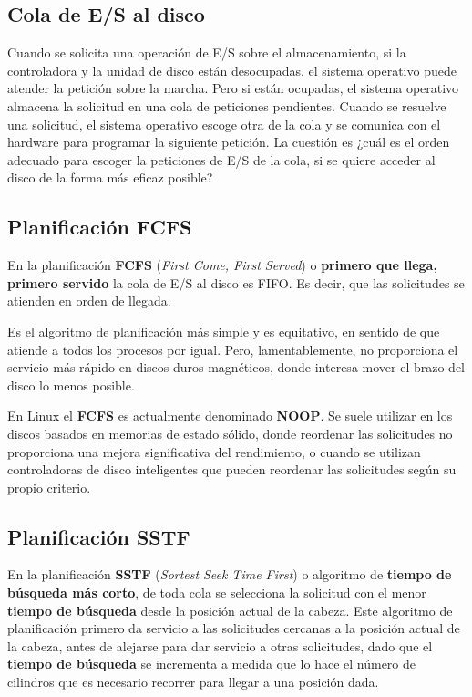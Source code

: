 \subsection{Cola de E/S al disco}\label{_cola_de_es_al_disco}

{} Cuando se solicita una operación de E/S sobre el almacenamiento, si
la controladora y la unidad de disco están desocupadas, el sistema
operativo puede atender la petición sobre la marcha. Pero si están
ocupadas, el sistema operativo almacena la solicitud en una cola de
peticiones pendientes. Cuando se resuelve una solicitud, el sistema
operativo escoge otra de la cola y se comunica con el hardware para
programar la siguiente petición. La cuestión es ¿cuál es el orden
adecuado para escoger la peticiones de E/S de la cola, si se quiere
acceder al disco de la forma más eficaz posible?

\subsection{Planificación FCFS}\label{_planificaciuxf3n_fcfs}

{} En la planificación \textbf{{}FCFS} (\emph{First Come, First Served})
o \textbf{primero que llega, primero servido} la cola de E/S al disco es
FIFO. Es decir, que las solicitudes se atienden en orden de llegada.

Es el algoritmo de planificación más simple y es equitativo, en sentido
de que atiende a todos los procesos por igual. Pero, lamentablemente, no
proporciona el servicio más rápido en discos duros magnéticos, donde
interesa mover el brazo del disco lo menos posible.

En Linux el \textbf{FCFS} es actualmente denominado \textbf{NOOP}. Se
suele utilizar en los discos basados en memorias de estado sólido, donde
reordenar las solicitudes no proporciona una mejora significativa del
rendimiento, o cuando se utilizan controladoras de disco inteligentes
que pueden reordenar las solicitudes según su propio criterio.

\subsection{Planificación SSTF}\label{_planificaciuxf3n_sstf}

{} En la planificación \textbf{{}SSTF} (\emph{Sortest} \emph{Seek Time
First}) o algoritmo de \textbf{tiempo de búsqueda más corto}, de toda
cola se selecciona la solicitud con el menor \textbf{tiempo de búsqueda}
desde la posición actual de la cabeza. Este algoritmo de planificación
primero da servicio a las solicitudes cercanas a la posición actual de
la cabeza, antes de alejarse para dar servicio a otras solicitudes, dado
que el \textbf{tiempo de búsqueda} se incrementa a medida que lo hace el
número de cilindros que es necesario recorrer para llegar a una posición
dada.

